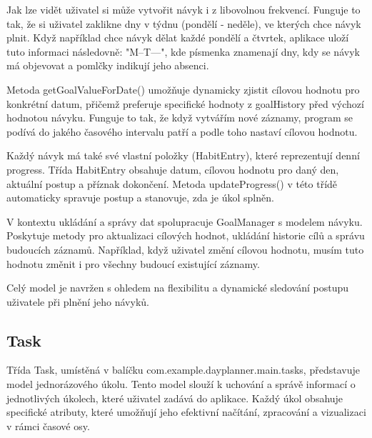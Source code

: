 Jak lze vidět uživatel si může vytvořit návyk i z libovolnou frekvencí. Funguje to tak, že si uživatel zaklikne dny v týdnu (pondělí - neděle), ve kterých chce návyk plnit. Když například chce návyk dělat každé pondělí a čtvrtek, aplikace uloží tuto informaci následovně: "M--T---", kde písmenka znamenají dny, kdy se návyk má objevovat a pomlčky indikují jeho absenci.

Metoda getGoalValueForDate() umožňuje dynamicky zjistit cílovou hodnotu pro konkrétní datum, přičemž preferuje specifické hodnoty z goalHistory před výchozí hodnotou návyku. Funguje to tak, že když vytvářím nové záznamy, program se podívá do jakého časového intervalu patří a podle toho nastaví cílovou hodnotu. 

Každý návyk má také své vlastní položky (HabitEntry), které reprezentují denní progress. Třída HabitEntry obsahuje datum, cílovou hodnotu pro daný den, aktuální postup a příznak dokončení. Metoda updateProgress() v této třídě automaticky spravuje postup a stanovuje, zda je úkol splněn.

V kontextu ukládání a správy dat spolupracuje GoalManager s modelem návyku. Poskytuje metody pro aktualizaci cílových hodnot, ukládání historie cílů a správu budoucích záznamů.
Například, když uživatel změní cílovou hodnotu, musím tuto hodnotu změnit i pro všechny budoucí existující záznamy.

Celý model je navržen s ohledem na flexibilitu a dynamické sledování postupu uživatele při plnění jeho návyků.

\subsection{Task}
\hspace{14pt} Třída Task, umístěná v balíčku com.example.dayplanner.main.tasks, představuje model jednorázového úkolu. Tento model slouží k uchování a správě informací o jednotlivých úkolech, které uživatel zadává do aplikace. Každý úkol obsahuje specifické atributy, které umožňují jeho efektivní načítání, zpracování a vizualizaci v rámci časové osy.  

